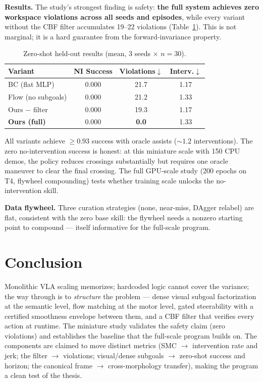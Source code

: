 \documentclass[conference,10pt]{IEEEtran}
\begin{document}
\textbf{Results.} The study's strongest finding is safety: \textbf{the full system achieves zero workspace violations across all seeds and episodes}, while every variant without the CBF filter accumulates 19--22 violations (Table~\ref{tab:results}). This is not marginal; it is a hard guarantee from the forward-invariance property.

\begin{table}[t]
\centering
\caption{Zero-shot held-out results (mean, 3 seeds $\times$ $n=30$).}
\label{tab:results}
\begin{tabular}{@{}lccc@{}}
\toprule
Variant & NI Success & Violations$\downarrow$ & Interv.$\downarrow$ \\
\midrule
BC (flat MLP) & 0.000 & 21.7 & 1.17 \\
Flow (no subgoals) & 0.000 & 21.2 & 1.33 \\
Ours $-$ filter & 0.000 & 19.3 & 1.17 \\
\textbf{Ours (full)} & 0.000 & \textbf{0.0} & 1.33 \\
\bottomrule
\end{tabular}
\end{table}

All variants achieve $\ge 0.93$ success with oracle assists ($\sim 1.2$ interventions). The zero no-intervention success is honest: at this miniature scale with 150 CPU demos, the policy reduces crossings substantially but requires one oracle maneuver to clear the final crossing. The full GPU-scale study (200 epochs on T4, flywheel compounding) tests whether training scale unlocks the no-intervention skill.

\textbf{Data flywheel.} Three curation strategies (none, near-miss, DAgger relabel) are flat, consistent with the zero base skill: the flywheel needs a nonzero starting point to compound --- itself informative for the full-scale program.

\section{Conclusion}
Monolithic VLA scaling memorizes; hardcoded logic cannot cover the variance; the way through is to \emph{structure} the problem --- dense visual subgoal factorization at the semantic level, flow matching at the motor level, gated steerability with a certified smoothness envelope between them, and a CBF filter that verifies every action at runtime. The miniature study validates the safety claim (zero violations) and establishes the baseline that the full-scale program builds on. The components are claimed to move distinct metrics (SMC $\to$ intervention rate and jerk; the filter $\to$ violations; visual/dense subgoals $\to$ zero-shot success and horizon; the canonical frame $\to$ cross-morphology transfer), making the program a clean test of the thesis.
\end{document}
